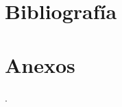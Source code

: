 \documentclass[12pt,a4paper]{article}
\begin{document}
\section{Bibliografía}                                                   %
\printbibliography                                                       %

\newpage

\section{Anexos}                                                         %
\setcounter{page}{1}                                                     %
\renewcommand{\thepage}{Anexo1 -\arabic{page}}                           %
%
\newpage                                                                 %
\newpage 
%
.
\renewcommand{\thepage}{Anexo 2 -\arabic{page}}





\end{document}

